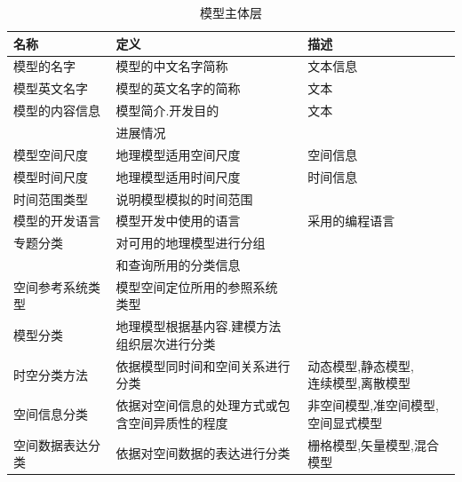 \documentclass[master]{njnuthesis}
\begin{document}
\begin{table}[ht]
\caption{模型主体层} \label{table1}
\begin{center}
\begin{tabular}{lll}
\hline
 名称              &  定义                                            &  描述                                   \\
\hline
 模型的名字        &  模型的中文名字简称                              &  文本信息                               \\
 模型英文名字      &  模型的英文名字的简称                            &  文本                                   \\
 模型的内容信息    &  模型简介.开发目的                               &  文本                                   \\
                   &  进展情况                                        &                                         \\
 模型空间尺度      &  地理模型适用空间尺度                            &  空间信息                               \\
 模型时间尺度      &  地理模型适用时间尺度                            &  时间信息                               \\
 时间范围类型      &  说明模型模拟的时间范围                          &                                         \\
 模型的开发语言    &  模型开发中使用的语言                            &  采用的编程语言                         \\
 专题分类          &  对可用的地理模型进行分组                        &                                         \\
                   &  和查询所用的分类信息                            &                                         \\
 空间参考系统类型  &  \tabincell{c}{模型空间定位所用的参照系统\\类型}                     \\
 模型分类          &  \tabincell{c}{地理模型根据基内容.建模方法\\组织层次进行分类}        \\
 时空分类方法      &  依据模型同时间和空间关系进行分类                &  \tabincell{c}{ 动态模型,静态模型,\\连续模型,离散模型}   \\
 空间信息分类      &  \tabincell{c}{依据对空间信息的处理方式或包\\含空间异质性的程度}  &   \tabincell{c}{非空间模型,准空间模型,\\空间显式模型}    \\
 空间数据表达分类  &  依据对空间数据的表达进行分类                    &  栅格模型,矢量模型,混合模型           \\
\hline
\end{tabular}
\end{center}
\end{table}
\end{document}
